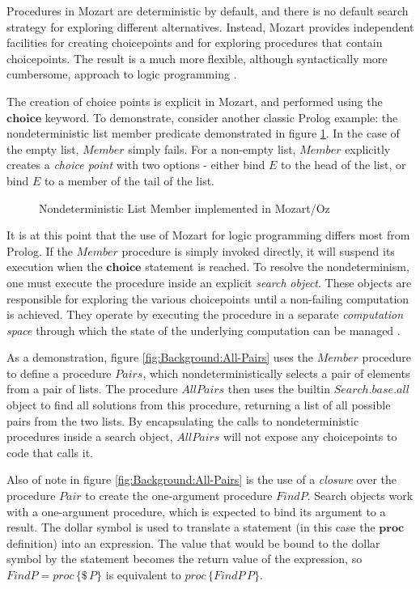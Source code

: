 Procedures in Mozart are deterministic by default, and there is no
default search strategy for exploring different alternatives. Instead,
Mozart provides independent facilities for creating choicepoints and
for exploring procedures that contain choicepoints. The result is
a much more flexible, although syntactically more cumbersome, approach
to logic programming \citep{lpinoz99}.

The creation of choice points is explicit in Mozart, and performed
using the $\mathbf{choice}$ keyword. To demonstrate, consider another
classic Prolog example: the nondeterministic list member predicate
demonstrated in figure \ref{fig:Background:Nondet-Member}. In the
case of the empty list, $Member$ simply fails. For a non-empty list,
$Member$ explicitly creates a \emph{choice point} with two options
- either bind $E$ to the head of the list, or bind $E$ to a member
of the tail of the list.

%
\begin{figure}[t]

\caption{Nondeterministic List Member implemented in Mozart/Oz\label{fig:Background:Nondet-Member}}

\end{figure}


It is at this point that the use of Mozart for logic programming differs
most from Prolog. If the $Member$ procedure is simply invoked directly,
it will suspend its execution when the $\mathbf{choice}$ statement
is reached. To resolve the nondeterminism, one must execute the procedure
inside an explicit \emph{search} \emph{object}. These objects are
responsible for exploring the various choicepoints until a non-failing
computation is achieved. They operate by executing the procedure in
a separate \emph{computation space} through which the state of the
underlying computation can be managed \citep{schulte00constraint_services}.

As a demonstration, figure \ref{fig:Background:All-Pairs} uses the
$Member$ procedure to define a procedure $Pairs$, which nondeterministically
selects a pair of elements from a pair of lists. The procedure $AllPairs$
then uses the builtin $Search.base.all$ object to find all solutions
from this procedure, returning a list of all possible pairs from the
two lists. By encapsulating the calls to nondeterministic procedures
inside a search object, $AllPairs$ will not expose any choicepoints
to code that calls it.

Also of note in figure \ref{fig:Background:All-Pairs} is the use
of a \emph{closure} over the procedure $Pair$ to create the one-argument
procedure $FindP$. Search objects work with a one-argument procedure,
which is expected to bind its argument to a result. The dollar symbol
is used to translate a statement (in this case the $\mathbf{proc}$
definition) into an expression. The value that would be bound to the
dollar symbol by the statement becomes the return value of the expression,
so $FindP=proc\,\{\$\, P\}$ is equivalent to $proc\,\{FindP\, P\}$.


